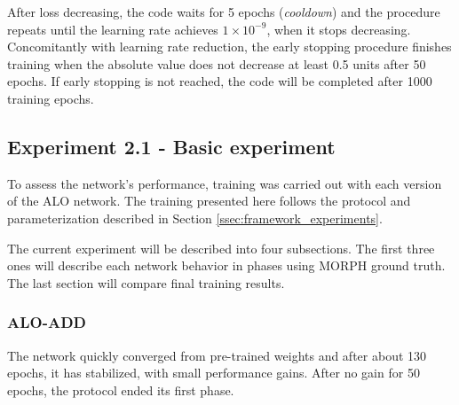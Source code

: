 After loss decreasing, the code waits for 5 epochs (\textit{cooldown}) and the procedure repeats until the learning rate achieves $1 \times 10^{-9}$, when it stops decreasing.
Concomitantly with learning rate reduction, the early stopping procedure finishes training when the absolute value does not decrease at least 0.5 units after 50 epochs.
If early stopping is not reached, the code will be completed after 1000 training epochs.

\subsection{Experiment 2.1 - Basic experiment}
\label{ssec:bsds_subexp1}

To assess the network's performance, training was carried out with each version of the ALO network.
The training presented here follows the protocol and parameterization described in Section \ref{ssec:framework_experiments}.

The current experiment will be described into four subsections.
The first three ones will describe each network behavior in phases using MORPH ground truth.
The last section will compare final training results.

\subsubsection{ALO-ADD}
\label{ssec:bsds_subexp1_add}

The network quickly converged from pre-trained weights and after about 130 epochs, it has stabilized, with small performance gains.
After no gain for 50 epochs, the protocol ended its first phase.



